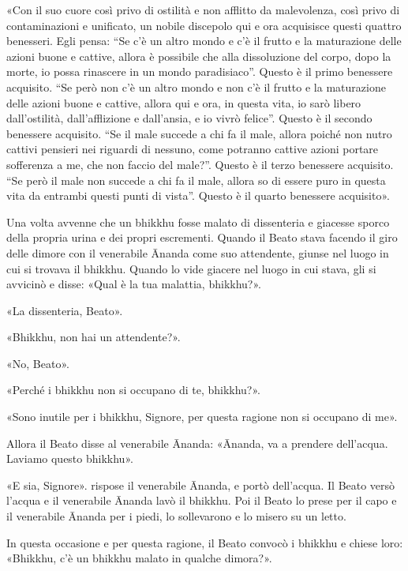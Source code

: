«Con il suo cuore così privo di ostilità e non afflitto da malevolenza, così
privo di contaminazioni e unificato, un nobile discepolo qui e ora acquisisce
questi quattro benesseri. Egli pensa: “Se c’è un altro mondo e c’è il frutto e
la maturazione delle azioni buone e cattive, allora è possibile che alla
dissoluzione del corpo, dopo la morte, io possa rinascere in un mondo
paradisiaco”. Questo è il primo benessere acquisito. “Se però non c’è un altro
mondo e non c’è il frutto e la maturazione delle azioni buone e cattive, allora
qui e ora, in questa vita, io sarò libero dall’ostilità, dall’afflizione e
dall’ansia, e io vivrò felice”. Questo è il secondo benessere acquisito. “Se il
male succede a chi fa il male, allora poiché non nutro cattivi pensieri nei
riguardi di nessuno, come potranno cattive azioni portare sofferenza a me, che
non faccio del male?”. Questo è il terzo benessere acquisito. “Se però il male
non succede a chi fa il male, allora so di essere puro in questa vita da
entrambi questi punti di vista”. Questo è il quarto benessere acquisito».


Una volta avvenne che un bhikkhu fosse malato di dissenteria e giacesse sporco
della propria urina e dei propri escrementi. Quando il Beato stava facendo il
giro delle dimore con il venerabile Ānanda come suo attendente, giunse nel luogo
in cui si trovava il bhikkhu. Quando lo vide giacere nel luogo in cui stava, gli
si avvicinò e disse: «Qual è la tua malattia, bhikkhu?».

«La dissenteria, Beato».

«Bhikkhu, non hai un attendente?».

«No, Beato».

«Perché i bhikkhu non si occupano di te, bhikkhu?».

«Sono inutile per i bhikkhu, Signore, per questa ragione non si occupano di me».

Allora il Beato disse al venerabile Ānanda: «Ānanda, va a prendere dell’acqua.
Laviamo questo bhikkhu».

«E sia, Signore». rispose il venerabile Ānanda, e portò dell’acqua. Il Beato
versò l’acqua e il venerabile Ānanda lavò il bhikkhu. Poi il Beato lo prese per
il capo e il venerabile Ānanda per i piedi, lo sollevarono e lo misero su un
letto.

In questa occasione e per questa ragione, il Beato convocò i bhikkhu e chiese
loro: «Bhikkhu, c’è un bhikkhu malato in qualche dimora?».

